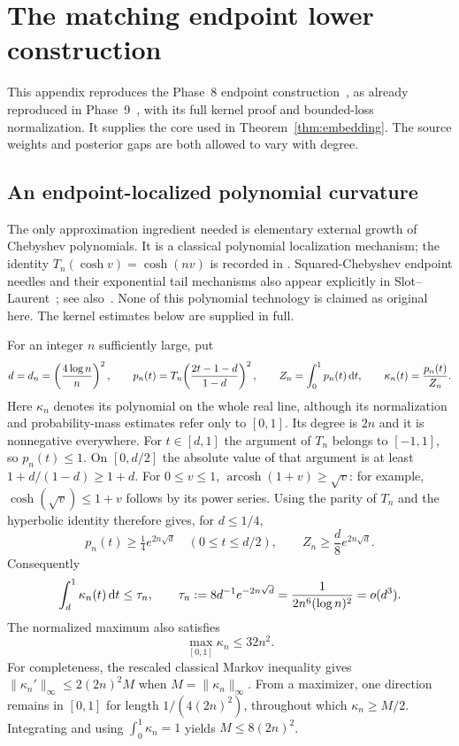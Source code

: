 \section{The matching endpoint lower construction}
\label{sec:ext-weights}
This appendix reproduces the Phase~8 endpoint construction~\cite{huang8},
as already reproduced in Phase~9~\cite{huang9}, with its full kernel proof
and bounded-loss normalization. It supplies the core used in
Theorem~\ref{thm:embedding}.
The source weights and posterior gaps are both allowed to vary with degree.

\subsection{An endpoint-localized polynomial curvature}
The only approximation ingredient needed is elementary external growth of
Chebyshev polynomials. It is a classical polynomial localization mechanism;
the identity $T_n(\cosh v)=\cosh(nv)$ is recorded in
\cite[Eq.~18.5.1]{dlmf}. Squared-Chebyshev endpoint needles and their exponential tail mechanisms
also appear explicitly in Slot--Laurent~\cite[Section~4.1]{slot2019};
see also~\cite{slot2020}. None of this polynomial technology is claimed
as original here. The kernel estimates below are supplied in full.

For an integer $n$ sufficiently large, put
\begin{equation}
 d=d_n=\left(\frac{4\log n}{n}\right)^2,\qquad
 p_n(t)=T_n\!\left(\frac{2t-1-d}{1-d}\right)^2,\qquad
 Z_n=\int_0^1p_n(t)\,\mathrm d t,\qquad
 \kappa_n(t)=\frac{p_n(t)}{Z_n}.
 \label{eq:ext-endpointneedle}
\end{equation}
Here $\kappa_n$ denotes its polynomial on the whole real line, although its
normalization and probability-mass estimates refer only to $[0,1]$.
Its degree is $2n$ and it is nonnegative everywhere. For $t\in[d,1]$ the
argument of $T_n$ belongs to $[-1,1]$, so $p_n(t)\le1$. On $[0,d/2]$ the
absolute value of that argument is at least $1+d/(1-d)\ge1+d$.
For $0\le v\le1$, $\operatorname{arcosh}(1+v)\ge\sqrt v$: for example,
$\cosh(\sqrt v)\le1+v$ follows by its power series. Using the parity of
$T_n$ and the hyperbolic identity therefore gives, for $d\le1/4$,
\[
 p_n(t)\ge\tfrac14e^{2n\sqrt d}\quad(0\le t\le d/2),\qquad
 Z_n\ge\frac d8 e^{2n\sqrt d}.
\]
Consequently
\begin{equation}
 \int_d^1\kappa_n(t)\,\mathrm d t\le\tau_n,
 \qquad
 \tau_n:=8d^{-1}e^{-2n\sqrt d}
       =\frac{1}{2n^6(\log n)^2}=o(d^3).
 \label{eq:ext-tail}
\end{equation}
The normalized maximum also satisfies
\begin{equation}
 \max_{[0,1]}\kappa_n\le32n^2.
 \label{eq:ext-max}
\end{equation}
For completeness, the rescaled classical Markov inequality
\cite{shadrin} gives $\|\kappa_n'\|_\infty\le2(2n)^2M$ when
$M=\|\kappa_n\|_\infty$. From a maximizer, one direction remains in $[0,1]$
for length $1/(4(2n)^2)$, throughout which $\kappa_n\ge M/2$.
Integrating and using $\int_0^1\kappa_n=1$ yields $M\le8(2n)^2$.

